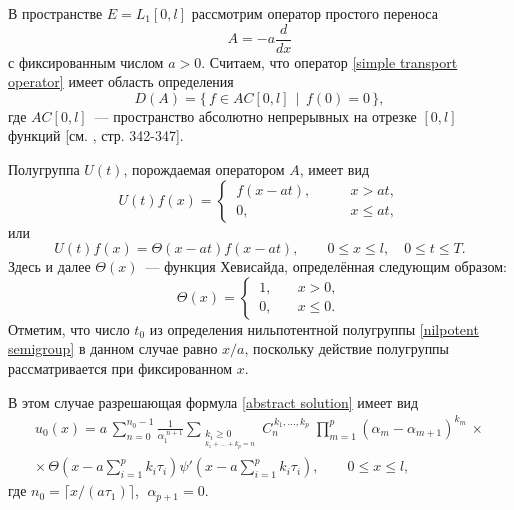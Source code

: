 \documentclass{article}
\renewcommand{\le}{\leqslant}
\renewcommand{\ge}{\geqslant}
\theoremstyle{definition}
\begin{document}
В пространстве $E = L_1[0,l]$ рассмотрим оператор простого переноса
\begin{equation} \label{simple transport operator}
	A = -a\dfrac{d}{dx}
\end{equation}
с фиксированным числом $a > 0$. Считаем, что оператор \eqref{simple transport operator} имеет область определения
\begin{equation} \label{domain of simple transport operator}
	D(A) = \{\, f \in AC[0,l] \;\, | \;\, f(0) = 0 \,\},
\end{equation} 
где $AC[0,l]$~--- пространство абсолютно непрерывных на отрезке $[0,l]$ функций [см. \cite{Kolmogorov_Fomin}, стр. 342-347]. 

Полугруппа $U(t)$, порождаемая оператором $A$, имеет вид 
\begin{equation*}
U(t)f(x) = 
	\begin{cases}
		\,f(x - at), & \qquad x > at, \\
		\,0, 		 & \qquad x \le at,
	\end{cases}
\end{equation*}
или
\begin{equation*}
	U(t)f(x) = \Theta(x - at)f(x - at), \qquad 0 \le x \le l, \quad 0 \le t \le T.
\end{equation*}
Здесь и далее $\Theta(x)$~--- функция Хевисайда, определённая следующим образом:
\begin{equation*}
\Theta(x) = 
	\begin{cases}
		\, 1, & \quad x > 0, \\
		\, 0, & \quad x \le 0.
	\end{cases}
\end{equation*} 
Отметим, что число $t_0$ из определения нильпотентной полугруппы \eqref{nilpotent semigroup} в данном случае равно $x/a$, поскольку действие полугруппы рассматривается при фиксированном $x$.

В этом случае разрешающая формула \eqref{abstract solution} имеет вид
\begin{equation} \label{homogenous solution}
\begin{gathered} 
	u_0(x) = a\,\sum\limits_{n = 0}^{n_0 - 1} \frac{1}{\alpha_1^{\,\,n + 1}}
	\sum\limits_{\substack{{k_i \ge 0} \\_{k_1 + ... + k_p = n}}}\!\!\!\!C_n^{\,k_1, ..., k_p}\;
	\prod_{m = 1}^{p}(\alpha_m - \alpha_{m + 1})^{k_m} \,\times \\[2mm] \times\,
	\Theta\!\left(x - a\sum\limits_{i = 1}^{p}k_i\tau_i \right)\psi'\!\left(x - a\sum\limits_{i = 1}^{p}k_i\tau_i\right), 
	\qquad 0 \le x \le l,
\end{gathered}
\end{equation}
где $n_0 = \lceil x / (a\tau_1) \rceil$, $\;\alpha_{p + 1} = 0$.
\end{document}
